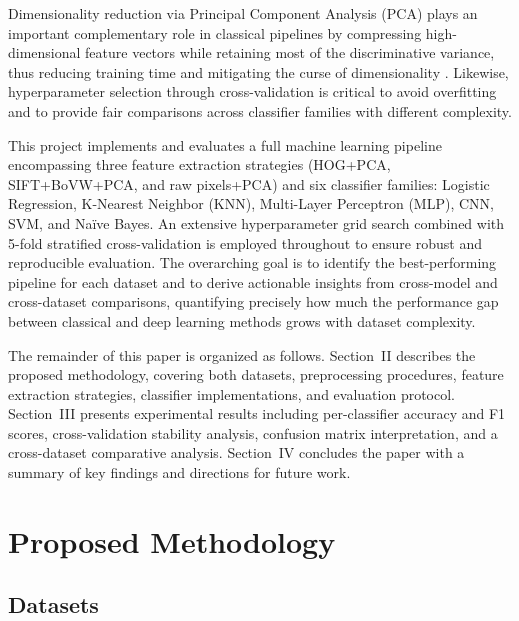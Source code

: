 \documentclass[conference]{IEEEtran}
\begin{document}
Dimensionality reduction via Principal Component Analysis (PCA) plays an important complementary role in classical pipelines by compressing high-dimensional feature vectors while retaining most of the discriminative variance, thus reducing training time and mitigating the curse of dimensionality \cite{pedregosa2011scikit}. Likewise, hyperparameter selection through cross-validation is critical to avoid overfitting and to provide fair comparisons across classifier families with different complexity.

This project implements and evaluates a full machine learning pipeline encompassing three feature extraction strategies (HOG+PCA, SIFT+BoVW+PCA, and raw pixels+PCA) and six classifier families: Logistic Regression, K-Nearest Neighbor (KNN), Multi-Layer Perceptron (MLP), CNN, SVM, and Naïve Bayes. An extensive hyperparameter grid search combined with 5-fold stratified cross-validation is employed throughout to ensure robust and reproducible evaluation. The overarching goal is to identify the best-performing pipeline for each dataset and to derive actionable insights from cross-model and cross-dataset comparisons, quantifying precisely how much the performance gap between classical and deep learning methods grows with dataset complexity.

The remainder of this paper is organized as follows. Section~II describes the proposed methodology, covering both datasets, preprocessing procedures, feature extraction strategies, classifier implementations, and evaluation protocol. Section~III presents experimental results including per-classifier accuracy and F1 scores, cross-validation stability analysis, confusion matrix interpretation, and a cross-dataset comparative analysis. Section~IV concludes the paper with a summary of key findings and directions for future work.

\section{Proposed Methodology}

\subsection{Datasets}
\end{document}
